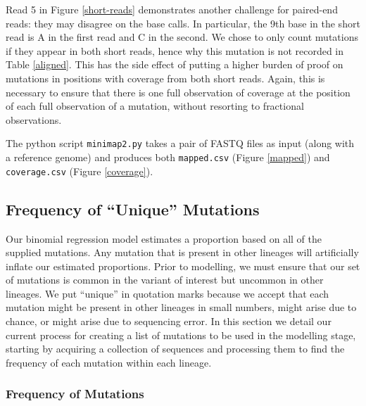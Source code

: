 \documentclass{article}
\begin{document}
Read 5 in Figure \ref{short-reads} demonstrates another challenge for paired-end reads: they may disagree on the base calls.
In particular, the 9th base in the short read is A in the first read and C in the second.
We chose to only count mutations if they appear in both short reads, hence why this mutation is not recorded in Table \ref{aligned}.
This has the side effect of putting a higher burden of proof on mutations in positions with coverage from both short reads.
Again, this is necessary to ensure that there is one full observation of coverage at the position of each full observation of a mutation, without resorting to fractional observations.

The python script \texttt{minimap2.py} takes a pair of FASTQ files as input (along with a reference genome) and produces both \texttt{mapped.csv} (Figure \ref{mapped}) and \texttt{coverage.csv} (Figure \ref{coverage}).


\subsection{Frequency of ``Unique'' Mutations}

Our binomial regression model estimates a proportion based on all of the supplied mutations.
Any mutation that is present in other lineages will artificially inflate our estimated proportions.
Prior to modelling, we must ensure that our set of mutations is common in the variant of interest but uncommon in other lineages.
We put ``unique'' in quotation marks because we accept that each mutation might be present in other lineages in small numbers, might arise due to chance, or might arise due to sequencing error.
In this section we detail our current process for creating a list of mutations to be used in the modelling stage, starting by acquiring a collection of sequences and processing them to find the frequency of each mutation within each lineage.

\subsubsection{Frequency of Mutations}
\end{document}
